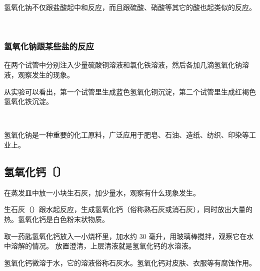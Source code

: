 氢氧化钠不仅跟盐酸起中和反应，而且跟硫酸、硝酸等其它的酸也起类似的反应。
\begin{fangchengshi}
     \\
\end{fangchengshi}

\subsubsection{氢氧化钠跟某些盐的反应}

\begin{shiyan}
    在两个试管中分别注入少量硫酸铜溶液和氯化铁溶液，然后各加几滴氢氧化钠溶液，观察发生的现象。
\end{shiyan}

从实验可以看出，第一个试管里生成蓝色氢氧化铜沉淀，第二个试管里生成红褐色氢氧化铁沉淀。
\begin{fangchengshi}
     \\
\end{fangchengshi}

氢氧化钠是一种重要的化工原料，广泛应用于肥皂、石油、造纸、纺织、印染等工业上。


\subsection{氢氧化钙〔〕}

\begin{shiyan}
    在蒸发皿中放一小块生石灰，加少量水，观察有什么现象发生。
\end{shiyan}

生石灰（）跟水起反应，生成氢氧化钙（俗称熟石灰或消石灰），同时放出大量的热。氢氧化钙是白色粉末状物质。
\begin{fangchengshi}
\end{fangchengshi}

\begin{shiyan}
    取一药匙氢氧化钙放入一小烧杯里，加水约 30 毫升，用玻璃棒搅拌，观察它在水中溶解的情况。
    放置澄清，上层清液就是氢氧化钙的水溶液。
\end{shiyan}

氢氧化钙微溶于水，它的溶液俗称石灰水。氢氧化钙对皮肤、衣服等有腐蚀作用。

